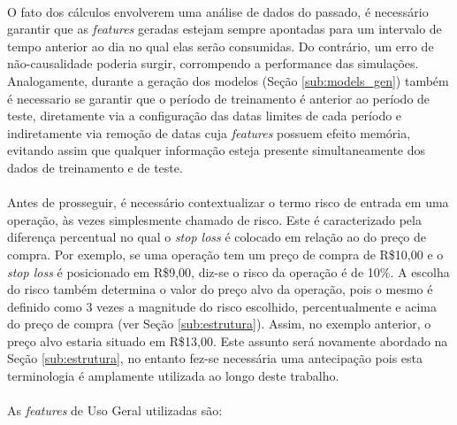 \paragraph{} O fato dos cálculos envolverem uma análise de dados do passado, é necessário garantir que as \textit{features} geradas estejam sempre apontadas para um intervalo de tempo anterior ao dia no qual elas serão consumidas. Do contrário, um erro de não-causalidade poderia surgir, corrompendo a performance das simulações. Analogamente, durante a geração dos modelos (Seção \ref{sub:models_gen}) também é necessario se garantir que o período de treinamento é anterior ao período de teste, diretamente via a configuração das datas limites de cada período e indiretamente via remoção de datas cuja \textit{features} possuem efeito memória, evitando assim que qualquer informação esteja presente simultaneamente dos dados de treinamento e de teste.

\paragraph{} Antes de prosseguir, é necessário contextualizar o termo risco de entrada em uma operação, às vezes simplesmente chamado de risco. Este é caracterizado pela diferença percentual no qual o \textit{stop loss} é colocado em relação ao do preço de compra. Por exemplo, se uma operação tem um preço de compra de R\$10,00 e o \textit{stop loss} é posicionado em R\$9,00, diz-se o risco da operação é de 10\%. A escolha do risco também determina o valor do preço alvo da operação, pois o mesmo é definido como 3 vezes a magnitude do risco escolhido, percentualmente e acima do preço de compra (ver Seção \ref{sub:estrutura}). Assim, no exemplo anterior, o preço alvo estaria situado em R\$13,00. Este assunto será novamente abordado na Seção \ref{sub:estrutura}, no entanto fez-se necessária uma antecipação pois esta terminologia é amplamente utilizada ao longo deste trabalho.

\paragraph{} As \textit{features} de Uso Geral utilizadas são:

